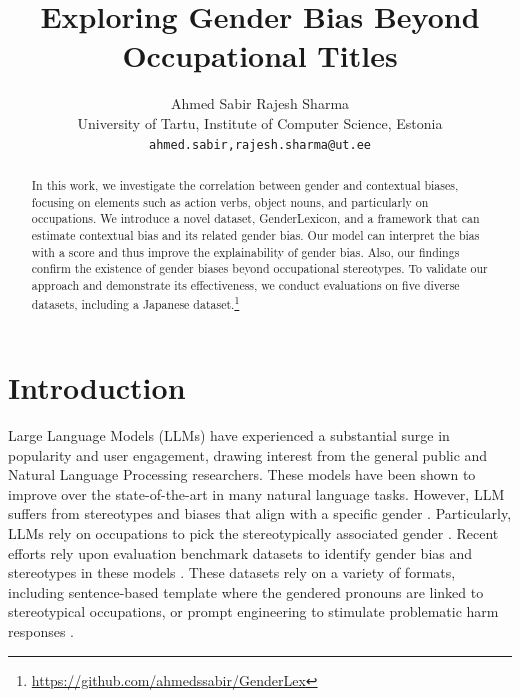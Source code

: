 \documentclass[11pt]{article}
\title{Exploring Gender Bias Beyond Occupational Titles}
\author{
Ahmed Sabir \quad Rajesh Sharma \\
University of Tartu, Institute of Computer Science, Estonia \\
\texttt{ahmed.sabir,rajesh.sharma@ut.ee}
}
\newcounter{prompt}
\begin{document}
\maketitle

\begin{abstract}
In this work, we investigate the correlation between gender and contextual biases, focusing on elements such as action verbs, object nouns, and particularly on occupations. We introduce a novel dataset, GenderLexicon, and a framework that can estimate contextual bias and its related gender bias. Our model can interpret the bias with a score and thus improve the explainability of gender bias. Also, our findings confirm the existence of gender biases beyond occupational stereotypes. To validate our approach and demonstrate its effectiveness, we conduct evaluations on five diverse datasets, including a Japanese dataset.\footnote{\url{https://github.com/ahmedssabir/GenderLex}}
\end{abstract}




\section{Introduction}
Large Language Models (LLMs) have experienced a substantial surge in popularity and user engagement, drawing interest from the general public and Natural Language Processing researchers. These models have been shown to improve over the state-of-the-art in many natural language tasks. However, LLM suffers from stereotypes and biases that align with a specific gender \cite{nangia2020crows}. Particularly, LLMs rely on occupations to pick the stereotypically associated gender \cite{gender-bias-llm}. Recent efforts rely upon evaluation benchmark datasets to identify gender bias and stereotypes in these models \cite{gallegos2023bias}. These datasets rely on a variety of formats, including sentence-based template  \cite{zhao2018gender, rudinger-EtAl:2018:N18,NEURIPS2020_92650b2e,gender-bias-llm} where the gendered pronouns are linked to stereotypical occupations, or prompt engineering to stimulate problematic harm responses \cite{sheng2019woman,gehman2020realtoxicityprompts,chang2023survey,wan2024white,kaukonen2025aunt}.
\end{document}

